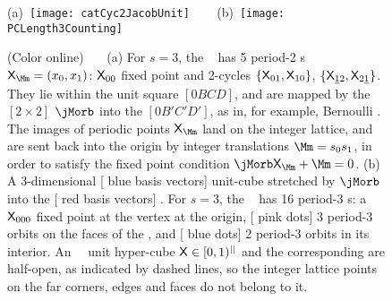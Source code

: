 \begin{figure}
  \centering
(a)~\texttt{[image: catCyc2JacobUnit]}
~~~
(b)~\texttt{[image: PCLength3Counting]}
  \caption{\label{fig:catCycJacob}
    (Color online)~~~
(a)
    For $s=3$, the \templatt\  has 5 period-2
    {\lattstate}s $\Xx_\Mm=(\ssp_0,\ssp_1)$: $\mathsf{X}_{00}$ fixed point and
    2-cycles $\{\mathsf{X}_{01},\mathsf{X}_{10}\}$,
    $\{\mathsf{X}_{\underline{1}2},\mathsf{X}_{2\underline{1}}\}$. They lie
    within the unit square $[0BCD]$, and are mapped by the
    $[2\!\times\!2]$ {\jacobianOrb} $\jMorb$  into the
    {\fundPip} $[0B'C'D']$, as in, for example, Bernoulli
    . The images of periodic points $\Xx_\Mm$
    land on the integer lattice, and are sent back into the origin by
    integer translations $\Mm= \Ssym{0}\Ssym{1}$, in order to satisfy the
    fixed point condition
    $\jMorb\Xx_\Mm+\Mm=0$.
(b) A 3-dimensional [{\color{blue} blue} basis vectors] unit-cube stretched by
    $\jMorb$  into the [{\color{red} red} basis vectors]
    {\fundPip}. For $s=3$, the \templatt\
     has 16 period-3 {\lattstate}s: a $\mathsf{X}_{000}$
    fixed point at the vertex at the origin, [{\color{red} pink dots}] 3
    period-3 orbits on the faces of the {\fundPip}, and
    [{\color{blue} blue dots}] 2 period-3 orbits in its interior.
    An \cl{}\dmn\ \statesp\ unit hyper-cube $\mathsf{X}\in[0,1)^{||}$ and the
    corresponding {\fundPip} are half-open, as indicated
    by dashed lines, so the integer lattice points on the far corners, edges
    and faces do not belong to it.
}
\end{figure}

